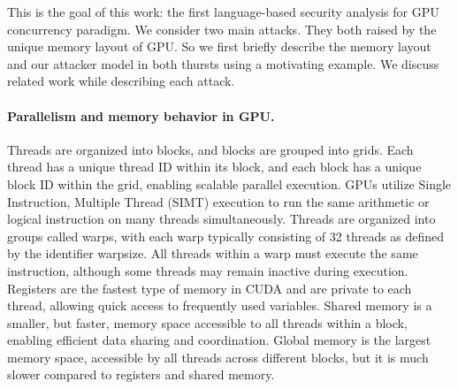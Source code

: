 This is the goal of this work: the first language-based security analysis for GPU concurrency paradigm.
%
We consider two main attacks.
%
They both raised by the unique memory layout of GPU.
%
So we first briefly describe the memory layout and our attacker model in both thursts using a motivating example.
%
We discuss related work while describing each attack.










\paragraph{Parallelism and memory behavior in GPU.} 
Threads are organized into blocks, and blocks are grouped into grids. 
%
Each thread has a unique thread ID within its block, and each block has a unique block ID within the grid, enabling scalable parallel execution.
%
GPUs utilize Single Instruction, Multiple Thread (SIMT) execution to run the same arithmetic or logical instruction on many threads simultaneously.
%
Threads are organized into groups called warps, with each warp typically consisting of 32 threads as defined by the identifier warpsize.
%
All threads within a warp must execute the same instruction, although some threads may remain inactive during execution.
%
Registers are the fastest type of memory in CUDA and are private to each thread, allowing quick access to frequently used variables. 
%
Shared memory is a smaller, but faster, memory space accessible to all threads within a block, enabling efficient data sharing and coordination. 
%
Global memory is the largest memory space, accessible by all threads across different blocks, but it is much slower compared to registers and shared memory.

